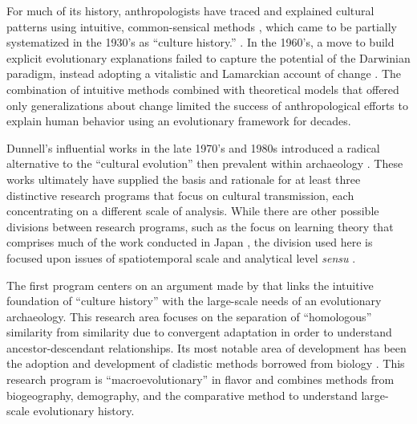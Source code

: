 For much of its history, anthropologists have traced and explained cultural patterns using intuitive, common-sensical methods , which came to be partially systematized in the 1930's as ``culture history.'' \citep{lyman1997rise,lyman2001direct,Lyman2003a,lyman2008cultural,o1998james,o2000time}.  In the 1960's, a move to build explicit evolutionary explanations failed to capture the potential of the Darwinian paradigm, instead adopting a vitalistic and Lamarckian account of change \citep{Dunnell1980}.  The combination of intuitive methods combined with theoretical models that offered only generalizations about change limited the success of anthropological efforts to explain human behavior using an evolutionary framework for decades. 

Dunnell's influential works in the late 1970's and 1980s introduced a radical alternative to the ``cultural evolution'' then prevalent within archaeology \citep{Dunnell1978,dunnell1982harvey,Dunnell1980,Dunnell1989}.  These works ultimately have supplied the basis and rationale for at least three distinctive research programs that focus on cultural transmission, each concentrating on a different scale of analysis.  While there are other possible divisions between research programs, such as the focus on learning theory that comprises much of the work conducted in Japan , the division used here is focused upon issues of spatiotemporal scale and analytical level \emph{sensu} \citet{Dunnell1971}.  

The first program centers on an argument made by \citet{Dunnell1978} that links the intuitive foundation of ``culture history'' with the large-scale needs of an evolutionary archaeology.  This research area focuses on the separation of ``homologous'' similarity from similarity due to convergent adaptation in order to understand ancestor-descendant relationships.  Its most notable area of development has been the adoption and development of cladistic methods borrowed from biology \citep{borgerhoff2006cultural,lyman1997rise,Lyman2006a,o1999seriation,o2000time,o2001cladistics,o2003cladistics,o2003resolving,OBrian2000,prentiss2019cultural,PRENTISS201564,Temkin2007}.  This research program is ``macroevolutionary'' in flavor and combines methods from biogeography, demography, and the comparative method to understand large-scale evolutionary history.  

